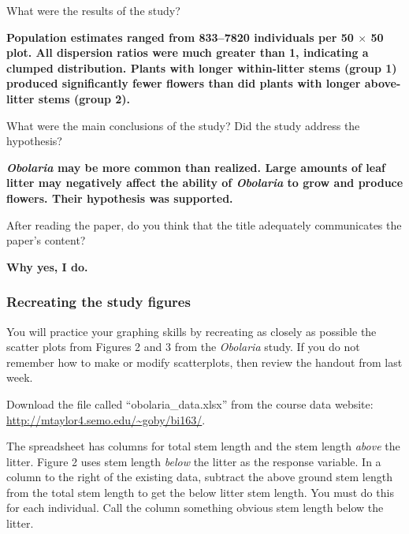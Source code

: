 \documentclass[12pt, hidelinks]{exam}
\newcommand*\AnswerBox[2]{%
    \parbox[t][#1]{0.92\textwidth}{%
    \vspace{-0.5\baselineskip}\begin{solution}\textbf{#2}\end{solution}}
    \vspace{\stretch{1}}
}
\newlength{\basespace}
\begin{document}
\begin{questions}
%

\question
What were the results of the study?

\AnswerBox{1.75\basespace}{Population estimates ranged from 833--7820 individuals per 50 $\times$ 50 plot. All dispersion ratios were much greater than 1, indicating a clumped distribution. Plants with longer within-litter stems (group 1) produced significantly fewer flowers than did plants with longer above-litter stems (group 2).}

\question
What were the main conclusions of the study? Did the study address the hypothesis?

\AnswerBox{\basespace}{\textit{Obolaria} may be more common than realized. Large amounts of leaf litter may negatively affect the ability of \textit{Obolaria} to grow and produce flowers. Their hypothesis was supported.}

\question
After reading the paper, do you think that the title adequately
communicates the paper's content?

\AnswerBox{\baselineskip}{Why yes, I do.}


\newpage

\subsubsection*{Recreating the study figures}

You will practice your graphing skills by recreating as closely as possible the scatter plots from Figures 2 and 3 from the \textit{Obolaria} study. If you do not remember how to make or modify scatterplots, then review the handout from last week. \medskip


Download the file called “obolaria\_data.xlsx” from the course data website:\\ \url{http://mtaylor4.semo.edu/~goby/bi163/}.\bigskip


The spreadsheet has columns for total stem length and the stem length \emph{above} the litter. Figure 2 uses stem length \emph{below} the litter as the response variable. In a column to the right of the existing data, subtract the above ground stem length from the total stem length to get the below litter stem length. You must do this for each individual. Call the column something obvious stem length below the litter.



\end{questions}
\end{document}
